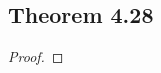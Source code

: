 \documentclass[../../main.tex]{subfiles}
\begin{document}
\subsection{Theorem 4.28}
\begin{wts}

\end{wts}
\begin{proof}

\end{proof}
\end{document}

